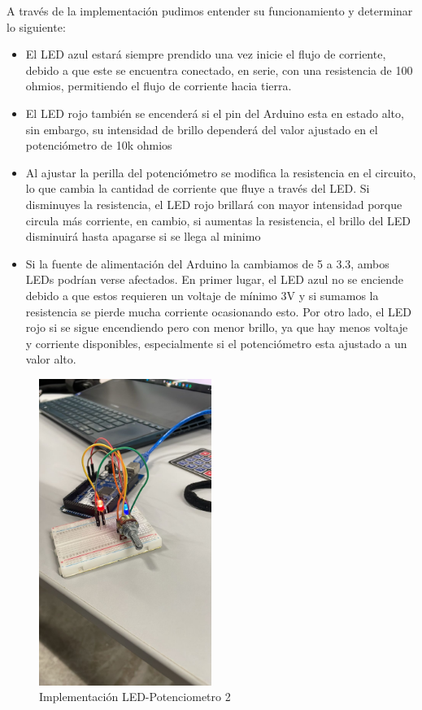 \documentclass{article}
\begin{document}
A través de la implementación pudimos entender su funcionamiento y determinar lo siguiente:
\begin{itemize}
    \item El LED azul estará siempre prendido una vez inicie el flujo de corriente, debido a que este se encuentra conectado, en serie, con una resistencia de 100 ohmios, permitiendo el flujo de corriente hacia tierra.
    \item El LED rojo también se encenderá si el pin del Arduino esta en estado alto, sin embargo, su intensidad de brillo dependerá del valor ajustado en el potenciómetro de 10k ohmios
    \item Al ajustar la perilla del potenciómetro se modifica la resistencia en el circuito, lo que cambia la cantidad de corriente que fluye a través del LED. Si disminuyes la resistencia, el LED rojo brillará con mayor intensidad porque circula más corriente, en cambio, si aumentas la resistencia, el brillo del LED disminuirá hasta apagarse si se llega al minimo
    \item Si la fuente de alimentación del Arduino la cambiamos de 5 a 3.3, ambos LEDs podrían verse afectados. En primer lugar, el LED azul no se enciende debido a que estos requieren un voltaje de mínimo 3V y si sumamos la resistencia se pierde mucha corriente ocasionando esto. Por otro lado, el LED rojo si se sigue encendiendo pero con menor brillo, ya que hay menos voltaje y corriente disponibles, especialmente si el potenciómetro esta ajustado a un valor alto.
\end{itemize}

\begin{figure}[H]
    \centering
    \includegraphics[width=0.50\textwidth]{./img/chkp-3-4-2.jpeg}
    \caption{Implementación LED-Potenciometro 2}
    \label{fig:simulacion_esquema5}
\end{figure}
\end{document}
